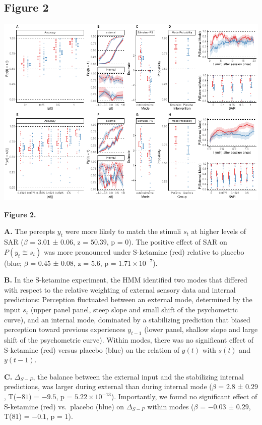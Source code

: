 \documentclass[
]{article}
\begin{document}
\newpage

\subsection{Figure 2}\label{figure-2}

\includegraphics{modes_ketamine_scz_files/figure-latex/Figure_2-1.pdf}

\textbf{Figure 2.}

\textbf{A.} The percepts \(y_t\) were more likely to match the stimuli
\(s_t\) at higher levels of SAR (\(\beta\) = \(3.01\) ± \(0.06\), z =
\(50.39\), p = \(0\)). The positive effect of SAR on
\(P(y_t \cong s_t)\) was more pronounced under S-ketamine (red) relative
to placebo (blue; \(\beta\) = \(0.45\) ± \(0.08\), z = \(5.6\), p =
\(\ensuremath{1.71\times 10^{-7}}\)).

\textbf{B.} In the S-ketamine experiment, the HMM identified two modes
that differed with respect to the relative weighting of external sensory
data and internal predictions: Perception fluctuated between an external
mode, determined by the input \(s_t\) (upper panel panel, steep slope
and small shift of the psychometric curve), and an internal mode,
dominated by a stabilizing prediction that biased perception toward
previous experiences \(y_{t-1}\) (lower panel, shallow slope and large
shift of the psychometric curve). Within modes, there was no significant
effect of S-ketamine (red) versus placebo (blue) on the relation of
\(y(t)\) with \(s(t)\) and \(y(t-1)\).

\textbf{C.} \(\Delta_{S-P}\), the balance between the external input and
the stabilizing internal predictions, was larger during external than
during internal mode (\(\beta\) = \(2.8\) ± \(0.29\), T(\(-81\)) =
\(-9.5\), p = \(\ensuremath{5.22\times 10^{-13}}\)). Importantly, we
found no significant effect of S-ketamine (red) vs.~placebo (blue) on
\(\Delta_{S-P}\) within modes (\(\beta\) = \(-0.03\) ± \(0.29\),
T(\(81\)) = \(-0.1\), p = \(1\)).
\end{document}
